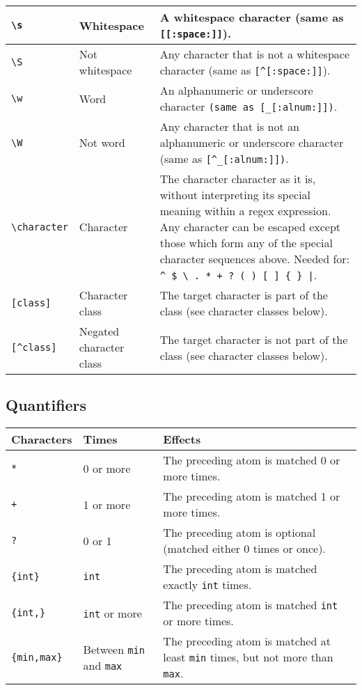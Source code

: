 \begin{center}
\begin{tabular}{|M{2cm}|M{3cm}|M{12cm}|}
		\hline
		\verb!\s!			&	Whitespace				&	A whitespace character (same as \verb![[:space:]]!).\\
		\hline
		\verb!\S!			&	Not whitespace			&	Any character that is not a whitespace character (same as \verb![^[:space:]]!).\\
		\hline
		\verb!\w!			&	Word					&	An alphanumeric or underscore character \verb!(same as [_[:alnum:]])!.\\
		\hline
		\verb!\W!			&	Not word				&	Any character that is not an alphanumeric or underscore character (same as \verb![^_[:alnum:]])!.\\
		\hline
		\verb!\character!	&	Character				&	The character character as it is, without interpreting its special meaning within a regex expression. Any character can be escaped except those which form any of the special character sequences above. Needed for: \verb!^ $ \ . * + ? ( ) [ ] { } |!.\\
		\hline\relax
		\verb![class]!		&	Character class			&	The target character is part of the class (see character classes below).\\
		\hline\relax
		\verb![^class]!		&	Negated character class	&	The target character is not part of the class (see character classes below).\\
		\hline
	\end{tabular}
\end{center}
\subsection{Quantifiers}
\begin{center}
	\begin{tabular}{|M{2cm}|M{3cm}|M{12cm}|}
		\hline
		Characters			&	Times								&	Effects\\
		\hline
		\verb!*!			&	0 or more							&	The preceding atom is matched 0 or more times.\\
		\hline
		\verb!+!			&	1 or more							&	The preceding atom is matched 1 or more times.\\
		\hline
		\verb!?!			&	0 or 1								&	The preceding atom is optional (matched either 0 times or once).\\
		\hline
		\verb!{int}!		&	\verb!int!							&	The preceding atom is matched exactly \verb!int! times.\\
		\hline
		\verb!{int,}!		&	\verb!int! or more					&	The preceding atom is matched \verb!int! or more times.\\
		\hline
		\verb!{min,max}!	&	Between \verb!min! and \verb!max!	&	The preceding atom is matched at least \verb!min! times, but not more than \verb!max!.\\
		\hline
	\end{tabular}
\end{center}

